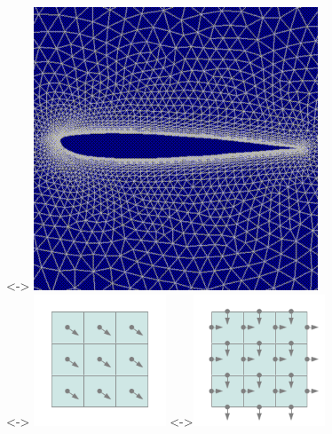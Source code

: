 \begin{frame}
\begin{columns}[c]
\begin{figure}
\centering
\uncover<\thefvmpauses->{
\includegraphics[width=.5\textwidth]{../Presentation/Images/Attribute/Grid/Zhukovskii_profile_by_NASA}
}
\\
\uncover<\thestaggeredpauses->{
\includegraphics[width=0.35\textwidth]{../Presentation/Images/Attribute/Staggered/Staggered_grid_schema1}
\quad
\uncover<\thestaggeredpauses->{\includegraphics[width=0.35\textwidth]{../Presentation/Images/Attribute/Staggered/Staggered_grid_schema2}}
}
\end{figure}

\end{columns}
\end{frame}